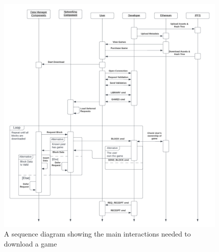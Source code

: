 \begin{figure}[!ht]
  \centering
  \includegraphics[width=\textwidth]{assets/images/diagrams/p2p-sequence.png}
  \caption{A sequence diagram showing the main interactions needed to download a game}
  \label{fig:p2p-interactions}
\end{figure}

